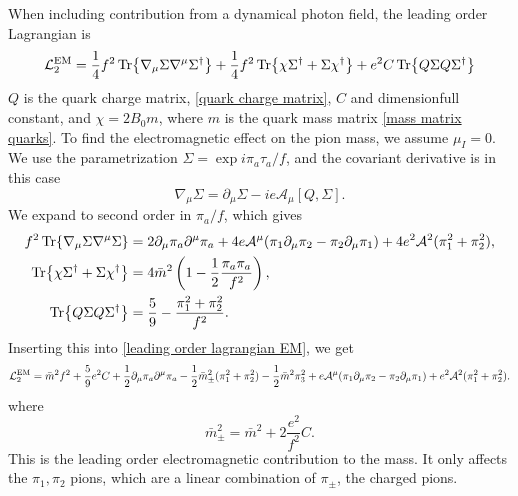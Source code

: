 When including contribution from a dynamical photon field, the leading order Lagrangian is~\autocite{eckerRoleResonancesChiral1989,urechVirtualPhotonsChiral1995}
%
\begin{equation}
    \label{leading order lagrangian EM}
    \mathcal{L}_2^{\text{EM}}
    = 
    \frac{1}{4}f^2 
    \Tr{
        \nabla_\mu \Sigma \nabla^\mu \Sigma^\dagger
    }
    +
    \frac{1}{4}f^2 
    \Tr{
        \chi \Sigma^\dagger + \Sigma\chi^\dagger
    }
    +
    e^2 C
    \Tr{Q \Sigma Q \Sigma^\dagger}
\end{equation}
%
$Q$ is the quark charge matrix, \autoref{quark charge matrix}, $C$ and dimensionfull constant, and $\chi = 2B_0 m$, where $m$ is the quark mass matrix \autoref{mass matrix quarks}.
To find the electromagnetic effect on the pion mass, we assume $\mu_I = 0$.
We use the parametrization $\Sigma = \exp{i \pi_a \tau_a / f}$, and the covariant derivative is in this case
%
\begin{equation}
    \nabla_\mu \Sigma = \partial_\mu \Sigma - i e \mathcal A_\mu [Q, \Sigma].
\end{equation}
%
We expand to second order in $\pi_a/f$, which gives
%
\begin{align}
    f^2 \Tr{\nabla_\mu \Sigma \nabla^\mu \Sigma}
    &=
    2\partial_\mu \pi_a\partial^\mu \pi_a
    + 4 e \mathcal A^\mu (\pi_1 \partial_\mu \pi_2 -\pi_2 \partial_\mu \pi_1)
    + 4 e^2 \mathcal A^2 (\pi_1^2 + \pi_2^2), \\
    \Tr{\chi \Sigma^\dagger + \Sigma \chi^\dagger}
    & = 4 \bar m^2\left(1 - \frac{1}{2} \frac{\pi_a \pi_a}{f^2}\right), \\
    \Tr{Q \Sigma Q \Sigma^\dagger}
    & = \frac{5}{9} - \frac{\pi_1^2 + \pi_2^2}{f^2}.
\end{align}
%
Inserting this into \autoref{leading order lagrangian EM}, we get
%
\begin{equation}
    \mathcal{L}_2^\text{EM}
    = \bar m^2 f^2 + \frac{5}{9}e^2 C
    + \frac{1}{2}\partial_\mu \pi_a \partial^\mu \pi_a
    - \frac{1}{2} \bar m_\pm^2 (\pi_1^2 + \pi_2^2) 
    - \frac{1}{2}\bar m^2 \pi_3^2
    + e \mathcal A^\mu (\pi_1 \partial_\mu \pi_2 -\pi_2 \partial_\mu \pi_1)
    + e^2 \mathcal A^2 (\pi_1^2 + \pi_2^2).
\end{equation}
%
where
\begin{equation}
    \bar m_\pm^2 = \bar m^2 + 2\frac{e^2}{f^2}C.
\end{equation}
%
This is the leading order electromagnetic contribution to the mass.
It only affects the $\pi_1, \pi_2$ pions, which are a linear combination of $\pi_\pm$, the charged pions.
